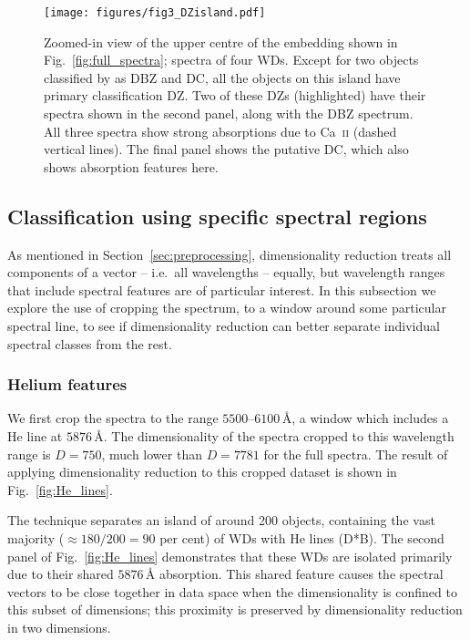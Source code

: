 \documentclass[fleqn,usenatbib]{mnras}
\begin{document}
\begin{figure}
\texttt{[image: figures/fig3\_DZisland.pdf]}
\caption{
    Zoomed-in view of the upper centre of the embedding shown in Fig.~\ref{fig:full_spectra}; spectra of four WDs.
    Except for two objects classified by \citet{manser24} as DBZ and DC, all the objects on this island have primary classification DZ.
    Two of these DZs (highlighted) have their spectra shown in the second panel, along with the DBZ spectrum.
    All three spectra show strong absorptions due to Ca~\textsc{ii} (dashed vertical lines).
    The final panel shows the putative DC, which also shows absorption features here.
}
\label{fig:DZisland}
\end{figure}

\subsection{Classification using specific spectral regions}
\label{sec:zoom}

As mentioned in Section~\ref{sec:preprocessing}, dimensionality reduction treats all components of a vector -- i.e.\ all wavelengths -- equally, but wavelength ranges that include spectral features are of particular interest.
In this subsection we explore the use of cropping the spectrum, to a window around some particular spectral line, to see if dimensionality reduction can better separate individual spectral classes from the rest.

\subsubsection{Helium features}
\label{sec:DBs}

We first crop the spectra to the range $5500$--$6100\,\text{\AA}$, a window which includes a He line at $5876\,\text{\AA}$.
The dimensionality of the spectra cropped to this wavelength range is $D=750$, much lower than $D=7781$ for the full spectra.
The result of applying dimensionality reduction to this cropped dataset is shown in Fig.~\ref{fig:He_lines}.

The technique separates an island of around 200 objects, containing the vast majority ($\approx 180/200=90$ per cent) of WDs with He lines (D*B).
The second panel of Fig.~\ref{fig:He_lines} demonstrates that these WDs are isolated primarily due to their shared $5876\,\text{\AA}$ absorption.
This shared feature causes the spectral vectors to be close together in data space when the dimensionality is confined to this subset of dimensions; this proximity is preserved by dimensionality reduction in two dimensions.
\end{document}
